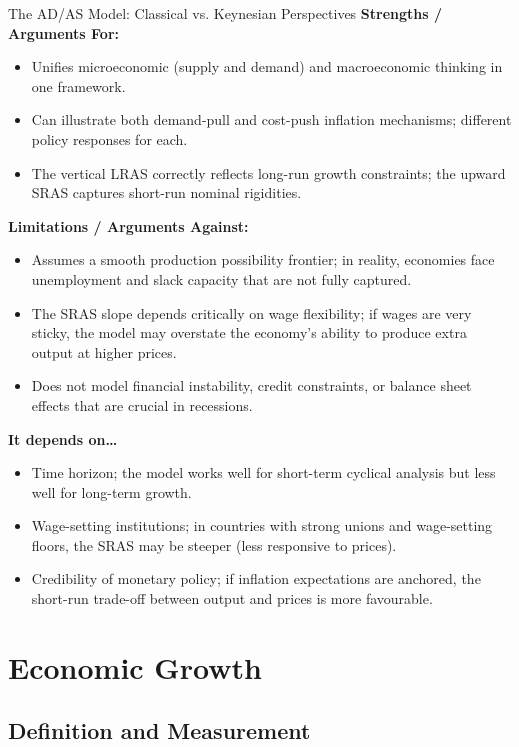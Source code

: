 \documentclass[11pt, a4paper, twoside]{book}
\begin{document}
\begin{evaluation}{The AD/AS Model: Classical vs. Keynesian Perspectives}
\textbf{Strengths / Arguments For:}
\begin{itemize}[leftmargin=*, nosep]
\item Unifies microeconomic (supply and demand) and macroeconomic thinking in one framework.
\item Can illustrate both demand-pull and cost-push inflation mechanisms; different policy responses for each.
\item The vertical LRAS correctly reflects long-run growth constraints; the upward SRAS captures short-run nominal rigidities.
\end{itemize}
\textbf{Limitations / Arguments Against:}
\begin{itemize}[leftmargin=*, nosep]
\item Assumes a smooth production possibility frontier; in reality, economies face unemployment and slack capacity that are not fully captured.
\item The SRAS slope depends critically on wage flexibility; if wages are very sticky, the model may overstate the economy's ability to produce extra output at higher prices.
\item Does not model financial instability, credit constraints, or balance sheet effects that are crucial in recessions.
\end{itemize}
\textbf{It depends on\ldots}
\begin{itemize}[leftmargin=*, nosep]
\item Time horizon; the model works well for short-term cyclical analysis but less well for long-term growth.
\item Wage-setting institutions; in countries with strong unions and wage-setting floors, the SRAS may be steeper (less responsive to prices).
\item Credibility of monetary policy; if inflation expectations are anchored, the short-run trade-off between output and prices is more favourable.
\end{itemize}
\end{evaluation}

\section{Economic Growth}

\subsection{Definition and Measurement}
\end{document}
